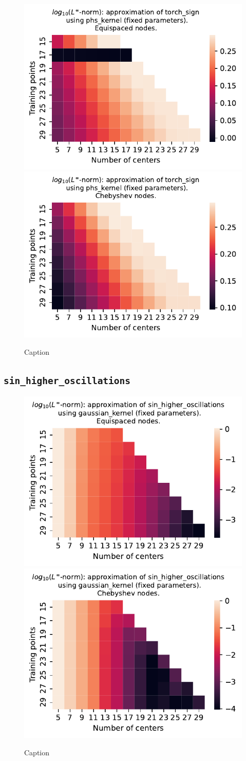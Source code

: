 \documentclass[12pt]{report} %
\begin{document}
\begin{figure}[ht]
  \centering
  \includegraphics[width=.49\textwidth]{imagenes/experiments/1d/least_squares/opt-torch_sign-Kphs_kernel-Equi.pdf}
  \includegraphics[width=.49\textwidth]{imagenes/experiments/1d/least_squares/opt-torch_sign-Kphs_kernel-Cheb.pdf}
  \caption{Caption}
  \label{fig:opt-torch-sign-phs}
\end{figure}

\subsection*{\texttt{sin\_higher\_oscillations}}

\begin{figure}[ht]
  \centering

  \includegraphics[width=.49\textwidth]{imagenes/experiments/1d/least_squares/opt-sin_higher_oscillations-Kgaussian_kernel-Equi.pdf}
  \includegraphics[width=.49\textwidth]{imagenes/experiments/1d/least_squares/opt-sin_higher_oscillations-Kgaussian_kernel-Cheb.pdf}
  \caption{Caption}
  \label{fig:opt-sin-higher-oscillations-gaussian}
\end{figure}
\end{document}
